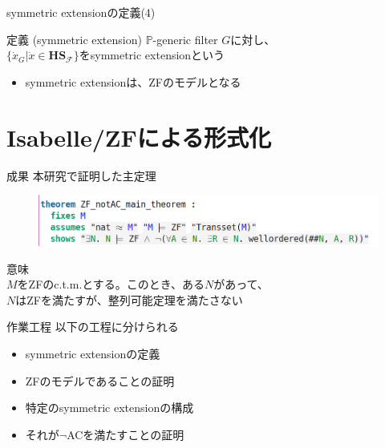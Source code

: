 \documentclass[17pt,aspectratio=169]{beamer}
\newcommand{\Pbb}{\mathbb{P}}
\newcommand{\Fcal}{\mathcal{F}}
\begin{document}
\begin{frame}{symmetric extensionの定義(4)}
    \begin{itembox}[l]{定義 (symmetric extension)}
        {\small
            $\Pbb$-generic filter $G$に対し、\\$\{ \dot{x}_G | \dot{x} \in \bm{\mathbf{HS}}_{\Fcal} \}$をsymmetric extensionという
        }
    \end{itembox}

    \begin{itemize}
        \item symmetric extensionは、ZFのモデルとなる
    \end{itemize}
\end{frame}

\section {Isabelle/ZFによる形式化}

\begin{frame}{成果}
    本研究で証明した主定理
    \vspace{-1cm}
    \hspace{-1.5cm}
    \begin{figure}
        \includegraphics[width=1.1\linewidth]{./images/ZF_notAC_main_theorem.png}
    \end{figure}

    \vspace{-5pt}
    意味 \\
    {\small
    \hspace{1cm} $M$をZFのc.t.m.とする。このとき、ある$N$があって、\\
    \hspace{1cm} $N$はZFを満たすが、整列可能定理を満たさない
    }
\end{frame}

\begin{frame}{作業工程}
    以下の工程に分けられる
    {\small
    \begin{itemize}[itemsep=8pt]
        \item symmetric extensionの定義
        \item ZFのモデルであることの証明
        \item 特定のsymmetric extensionの構成
        \item それが$\neg$ACを満たすことの証明
    \end{itemize} }
\end{frame}
\end{document}
